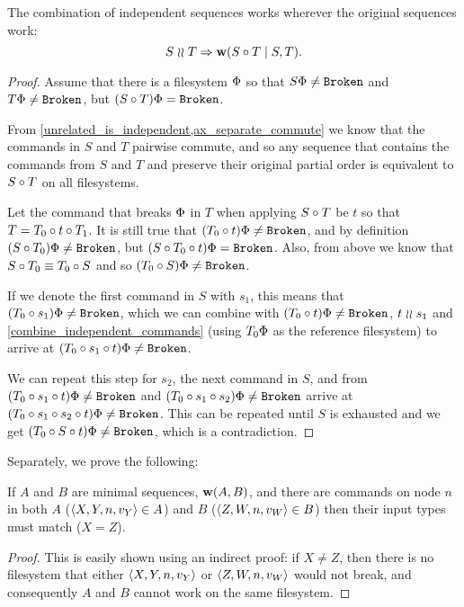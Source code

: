 \begin{mylem}\label{combine_independent_sequences}
The combination of independent sequences works wherever the original sequences work:
\[ S\mathrel{\wr\wr} T \Rightarrow \mathbf{w}({S\circ T}\mathrel{|}{S,T}). \]
\end{mylem}
\begin{proof}
Assume that there is a filesystem $\Phi$ so that
$S\Phi\neq\mathtt{Broken}$ and $T\Phi\neq\mathtt{Broken}$, but
$(S\circ T)\Phi=\mathtt{Broken}$.

From \cref{unrelated_is_independent,ax_separate_commute} we know that
the commands in $S$ and $T$ pairwise commute, and so any sequence
that contains the commands from $S$ and $T$ and preserve their original partial order
is equivalent to $S\circ T$ on all filesystems.

Let the command that breaks $\Phi$ in $T$ when applying $S\circ T$ be $t$
so that $T=T_0\circ t\circ T_1$.
It is still true that $(T_0 \circ t)\Phi\neq\mathtt{Broken}$,
and by definition $(S\circ T_0)\Phi\neq\mathtt{Broken}$,
but $(S\circ T_0\circ t)\Phi=\mathtt{Broken}$.
Also, from above we know that $S\circ T_0\equiv T_0\circ S$
and so $(T_0 \circ S)\Phi\neq\mathtt{Broken}$.

If we denote the first command in $S$ with $s_1$,
this means that $(T_0 \circ s_1)\Phi\neq\mathtt{Broken}$,
which we can combine with $(T_0 \circ t)\Phi\neq\mathtt{Broken}$, $t\mathrel{\wr\wr} s_1$ and
\cref{combine_independent_commands}
(using $T_0\Phi$ as the reference filesystem)
to arrive at $(T_0 \circ s_1\circ t)\Phi\neq\mathtt{Broken}$.

We can repeat this step for $s_2$, the next command in $S$,
and from 
$(T_0 \circ s_1\circ t)\Phi\neq\mathtt{Broken}$
and
$(T_0 \circ s_1\circ s_2)\Phi\neq\mathtt{Broken}$
arrive at
$(T_0 \circ s_1\circ s_2\circ t)\Phi\neq\mathtt{Broken}$.
This can be repeated until $S$ is exhausted and we get
$(T_0 \circ S\circ t)\Phi\neq\mathtt{Broken}$, which is a contradiction.
\end{proof}

Separately, we prove the following:

\begin{mylem}\label{worksinputmatch}
If $A$ and $B$ are minimal sequences, $\mathbf{w}({A,B})$,
and there are commands on node $n$ in both $A$ ($\langle{X,Y,n,v_Y}\rangle\in A$) and $B$ ($\langle{Z,W,n,v_W}\rangle\in B$)
then their input types must match ($X=Z$).
\end{mylem}
\begin{proof}
This is easily shown using an indirect proof: if $X\neq Z$, then there is no filesystem that
either $\langle{X,Y,n,v_Y}\rangle$ or $\langle{Z,W,n,v_W}\rangle$ would not break, 
and consequently $A$ and $B$ cannot work on the same filesystem.
\end{proof}



